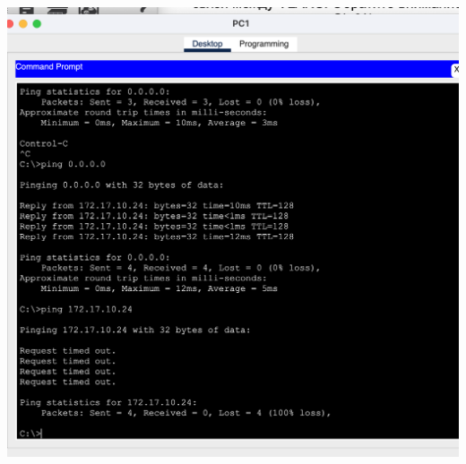 \documentclass[a4paper,14pt]{extarticle}
\begin{document}
\begin{enumerate}
\begin{itemize}
\begin{center}
                    \includegraphics[scale=0.45]{pics/3.3.12_4.png}
                \end{center}


\end{itemize}
\end{enumerate}
\end{document}
